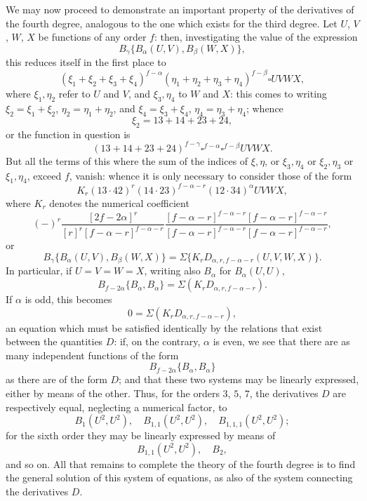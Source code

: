 \documentclass[11pt,a4paper]{book}
\begin{document}
\newpage
\setcounter{page}{109}

We may now proceed to demonstrate an important property of the derivatives of
the fourth degree, analogous to the one which exists for the third degree. Let
$U$, $V$, $W$, $X$ be functions of any order $f$: then, investigating the value of the expression
\[
B_{\gamma}\{B_{\alpha}(U, V), B_{\beta}(W, X)\},
\]
this reduces itself in the first place to
\[
(\xi_1 + \xi_2 + \xi_3 + \xi_4)^{f-\alpha} (\eta_1 + \eta_2 + \eta_3 + \eta_4)^{f-\beta} \square UVWX,
\]
where $\xi_1, \eta_2$ refer to $U$ and $V$, and $\xi_3, \eta_4$ to $W$ and $X$: this comes to writing
$\xi_2 = \xi_1 + \xi_2$, $\eta_2 = \eta_1 + \eta_2$, and $\xi_4 = \xi_3 + \xi_4$, $\eta_4 = \eta_3 + \eta_4$; whence
\[
\xi_2 = 13 + 14 + 23 + 24,
\]
or the function in question is
\[
(13 + 14 + 23 + 24)^{f-\gamma} \square^{f-\alpha} \square^{f-\beta} UVWX.
\]
But all the terms of this where the sum of the indices of $\xi, \eta$, or $\xi_3, \eta_4$ or
$\xi_2, \eta_3$ or $\xi_1, \eta_4$, exceed $f$, vanish: whence it is only necessary to consider those of the
form
\[
K_r (13 \cdot 42)^r (14 \cdot 23)^{f-\alpha-r} (12 \cdot 34)^{\alpha} UVWX,
\]
where $K_r$ denotes the numerical coefficient
\[
(-)^r \frac{[2f-2\alpha]^r}{[r]^r [f-\alpha-r]^{f-\alpha-r}} \frac{[f-\alpha-r]^{f-\alpha-r} [f-\alpha-r]^{f-\alpha-r}}{[f-\alpha-r]^{f-\alpha-r} [f-\alpha-r]^{f-\alpha-r}},
\]
or
\[
B_{\gamma}\{B_{\alpha}(U, V), B_{\beta}(W, X)\}
= \Sigma \{K_r D_{\alpha,r,f-\alpha-r}(U, V, W, X)\}.
\]
In particular, if $U=V=W=X$, writing also $B_{\alpha}$ for $B_{\alpha}(U, U)$,
\[
B_{f-2\alpha}\{B_{\alpha}, B_{\alpha}\} = \Sigma (K_r D_{\alpha,r,f-\alpha-r}).
\]
If $\alpha$ is odd, this becomes
\[
0 = \Sigma (K_r D_{\alpha,r,f-\alpha-r}),
\]
an equation which must be satisfied identically by the relations that exist between
the quantities $D$: if, on the contrary, $\alpha$ is even, we see that there are as many
independent functions of the form
\[
B_{f-2\alpha}\{B_{\alpha}, B_{\alpha}\}
\]
as there are of the form $D$; and that these two systems may be linearly expressed,
either by means of the other. Thus, for the orders $3$, $5$, $7$, the derivatives $D$ are
respectively equal, neglecting a numerical factor, to
\[
B_1(U^2, U^2),\quad B_{1,1}(U^2, U^2),\quad B_{1,1,1}(U^2, U^2);
\]
for the sixth order they may be linearly expressed by means of
\[
B_{1,1}(U^2, U^2),\quad B_2,
\]
and so on. All that remains to complete the theory of the fourth degree is to find
the general solution of this system of equations, as also of the system connecting the
derivatives $D$.
\end{document}
